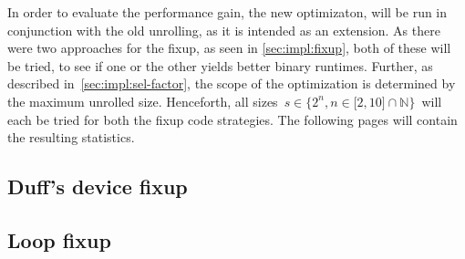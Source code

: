 In order to evaluate the performance gain, the new optimizaton, will be run in conjunction with the old unrolling, as it is intended as an extension.
As there were two approaches for the fixup, as seen in \cref{sec:impl:fixup}, both of these will be tried, to see if one or the other yields better binary runtimes.
Further, as described in~\cref{sec:impl:sel-factor}, the scope of the optimization is determined by the maximum unrolled size.
Henceforth, all sizes~$s \in \{2^n, n \in \lbrack 2, 10 \rbrack \cap \mathbb{N}\}$~will each be tried for both the fixup code strategies.
The following pages will contain the resulting statistics.

\subsection{Duff's device fixup}\label{sec:eval:perf:duff}

\subsection{Loop fixup}\label{sec:eval:perf:loop}